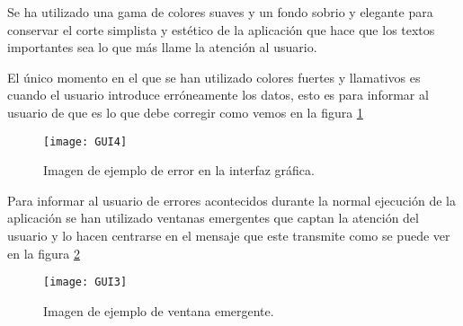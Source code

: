 Se ha utilizado una gama de colores suaves y un fondo sobrio y elegante para conservar el corte simplista y estético de la aplicación que hace que los textos importantes sea lo que más llame la atención al usuario.

El único momento en el que se han utilizado colores fuertes y llamativos es cuando el usuario introduce erróneamente los datos, esto es para informar al usuario de que es lo que debe corregir como vemos en la figura \ref{fig:gui4} 
\begin{figure}[H]
	\centering
	\texttt{[image: GUI4]}
	\caption{Imagen de ejemplo de error en la interfaz gráfica.}
	\label{fig:gui4}
\end{figure}

Para informar al usuario de errores acontecidos durante la normal ejecución de la aplicación se han utilizado ventanas emergentes que captan la atención del usuario y lo hacen centrarse en el mensaje que este transmite como se puede ver en la  figura \ref{fig:gui3}
\begin{figure}[H]
	\centering
	\texttt{[image: GUI3]}
	\caption{Imagen de ejemplo de ventana emergente.}
	\label{fig:gui3}
\end{figure}
